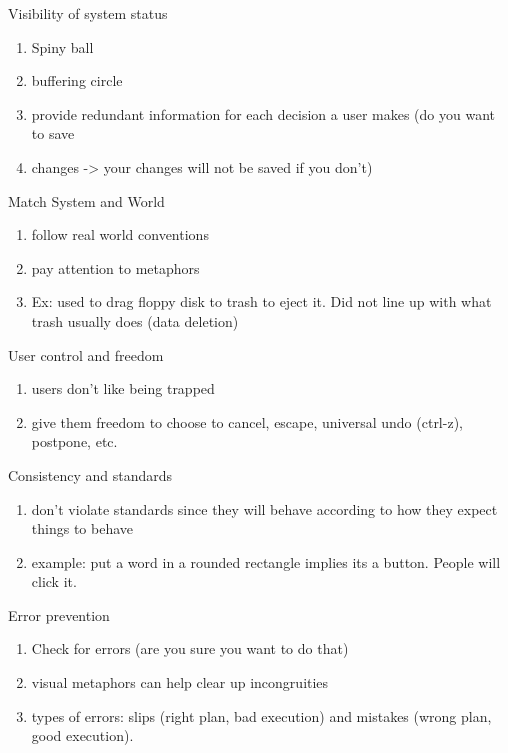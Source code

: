 \documentclass[11pt]{article}
\begin{document}
Visibility of system status 
\begin{enumerate}
    \item Spiny ball
    \item buffering circle
    \item provide redundant information for each decision a user makes (do you want to save     
    \item changes -> your changes will not be saved if you don't)
\end{enumerate}


Match System and World
\begin{enumerate}
    
\item follow real world conventions
\item pay attention to metaphors
\item Ex: used to drag floppy disk to trash to eject it. Did not line up with what trash usually does (data deletion)

\end{enumerate}

User control and freedom
\begin{enumerate}
    \item users don't like being trapped
    \item give them freedom to choose to cancel, escape, universal undo (ctrl-z), postpone, etc.
 
\end{enumerate}



Consistency and standards
\begin{enumerate}
    \item don't violate standards since they will behave according to how they expect things to behave
    \item example: put a word in a rounded rectangle implies its a button. People will click it.
\end{enumerate}

Error prevention
\begin{enumerate}
    \item Check for errors (are you sure you want to do that)
    \item visual metaphors can help clear up incongruities
    \item types of errors: slips (right plan, bad execution) and mistakes (wrong plan, good execution). 
    
\end{enumerate}
\end{document}
